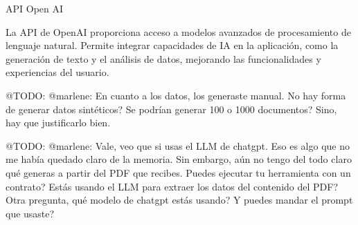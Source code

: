 API Open AI

La API de OpenAI proporciona acceso a modelos avanzados de procesamiento de lenguaje natural.
Permite integrar capacidades de IA en la aplicación, como la generación de texto y el análisis de datos, mejorando las
funcionalidades y experiencias del usuario.


\colorbox{color_highlight}{@TODO: @marlene:}
En cuanto a los datos, los generaste manual. No hay forma de generar datos sintéticos? Se podrían generar 100 o 1000
documentos? Sino, hay que justificarlo bien.

\colorbox{color_highlight}{@TODO: @marlene:}
Vale, veo que si usas el LLM de chatgpt. Eso es algo que no me había quedado claro de la memoria. Sin embargo, aún no
tengo del todo claro qué generas a partir del PDF que recibes. Puedes ejecutar tu herramienta con un contrato? Estás
usando el LLM para extraer los datos del contenido del PDF? Otra pregunta, qué modelo de chatgpt estás usando? Y puedes
mandar el prompt que usaste?
